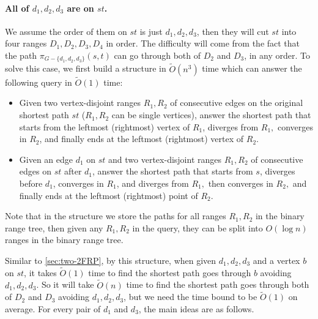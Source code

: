 \documentclass[11pt]{article}
\theoremstyle{plain}
\theoremstyle{definition}
\newcommand{\set}[1]{\{ #1 \}}
\newcommand{\og}[3]{\pi_{G-#3}\left(#1,#2\right)}
\begin{document}
\paragraph{All of $d_1,d_2,d_3$ are on $st$.} We assume the order of them on $st$ is just $d_1,d_2,d_3$, then they will cut $st$ into four ranges $D_1,D_2,D_3,D_4$ in order. The difficulty will come from the fact that the path $\og{s}{t}{\set{d_1, d_2,d_3}}$ can go through both of $D_2$ and $D_3$, in any order. To solve this case, we first build a structure in $\tilde{O}(n^3)$ time which can answer the following query in $\tilde{O}(1)$ time: 
\begin{itemize}
    \item Given two vertex-disjoint ranges $R_1,R_2$ of consecutive edges on the original shortest path $st$ ($R_1, R_2$ can be single vertices), answer the shortest path that starts from the leftmost (rightmost) vertex of $R_1$, diverges from $R_1,$ converges in $R_2$, and finally ends at the leftmost (rightmost) vertex of $R_2$.
    \item Given an edge $d_1$ on $st$ and two vertex-disjoint ranges $R_1,R_2$ of consecutive edges on $st$ after $d_1$, answer the shortest path that starts from $s$, diverges before $d_1$, converges in $R_1$, and diverges from $R_1,$ then converges in $R_2,$ and finally ends at the leftmost (rightmost) point of $R_2$. 
\end{itemize}



Note that in the structure we store the paths for all ranges $R_1,R_2$ in the binary range tree, then given any $R_1,R_2$ in the query, they can be split into $O(\log n)$ ranges in the binary range tree.

Similar to \cref{sec:two-2FRP}, by this structure, when given $d_1,d_2,d_3$ and a vertex $b$ on $st$, it takes $\tilde{O}(1)$ time to find the shortest path goes through $b$ avoiding $d_1,d_2,d_3$. So it will take $\tilde{O}(n)$ time to find the shortest path goes through both of $D_2$ and $D_3$ avoiding $d_1,d_2,d_3$, but we need the time bound to be $\tilde{O}(1)$ on average. For every pair of $d_1$ and $d_3$, the main ideas are as follows.
\end{document}
